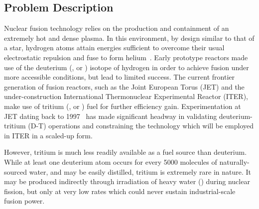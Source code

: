 \subsection{Problem Description}
\label{sec:problemdescription}

Nuclear fusion technology relies on the production and containment of an
extremely hot and dense plasma. In this environment, by design similar to that
of a star, hydrogen atoms attain energies sufficient to overcome their usual
electrostatic repulsion and fuse to form helium~\cite{Hernandez2018}. Early prototype reactors
made use of the deuterium (, or ) isotope of hydrogen in order to
achieve fusion under more accessible conditions, but lead to limited success.
The current frontier generation of fusion reactors, such as the Joint European Torus (JET) and the
under-construction International Thermonuclear Experimental Reactor (ITER), make
use of tritium (, or ) fuel for further efficiency gain.
Experimentation at JET dating back to 1997~\cite{Keilhacker1999} has made significant headway in
validating deuterium-tritium (D-T) operations and constraining the technology
which will be employed in ITER in a scaled-up form.

However, tritium is much less readily available as a fuel source than deuterium.
While at least one deuterium atom occurs for every \num{5000} molecules of
naturally-sourced water, and may be easily distilled, tritium is extremely rare
in nature. It may be produced indirectly through irradiation of heavy water
() during nuclear fission, but only at very low rates which could
never sustain industrial-scale fusion power.

